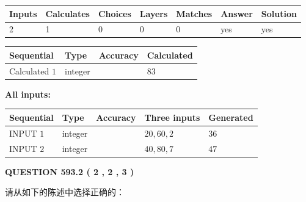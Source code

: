 \documentclass{ctexart}
\begin{document}
 
\noindent{}
 
 

 
   
   
   
   
\noindent\begin{tabular}{|l|l|l|l|l|l|l|}
 \hline
Inputs & Calculates & Choices & Layers & Matches & Answer & Solution \\ \hline
 2  & 
 1  & 
 0
  & 
 0  & 
 0  & 
  yes & 
  yes 
  \\ \hline
 \end{tabular}
   
   
   
   
\noindent{}
   
   
  
  
\noindent\begin{tabular}{|l|l|l|l|}
\hline
 Sequential & Type & Accuracy & Calculated \\ 
\hline
 
 
  Calculated $  1 $ & integer &  & 
  $ 83 $ 
 \\  \hline  
 \end{tabular}
   
   
   
   
\noindent\vspace{0.1in}\hspace{-0.08in} {\textbf{\Large{All inputs: }}}
   
   
  
  
\noindent\begin{tabular}{|l|l|l|l|l|}
\hline
 Sequential & Type & Accuracy & Three inputs & Generated \\ 
\hline
 
 
  INPUT $  1 $ & integer &  & $
 20
 , 
 60
 , 
 2
 $ & $ 36 $ 
 \\  \hline  
 
 
  INPUT $  2 $ & integer &  & $
 40
 , 
 80
 , 
 7
 $ & $ 47 $ 
 \\  \hline  
 \end{tabular}
   
   
  
\vspace{0.2in}
  
{\textbf{\Large{QUESTION
593.2 
 ( 2 , 2 , 3 )
}}}
  
  
请从如下的陈述中选择正确的：
 
\end{document}
